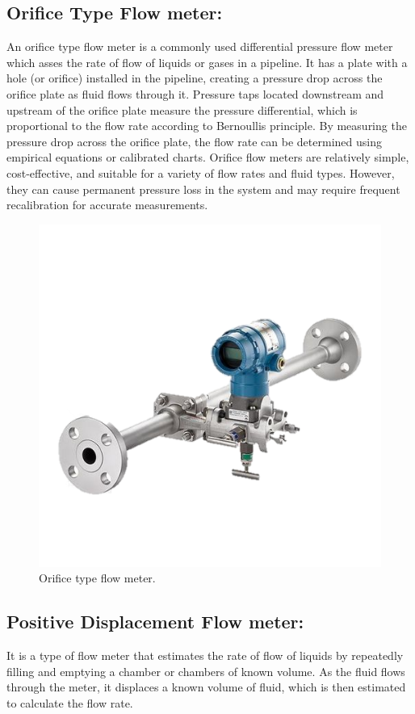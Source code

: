 \subsection{Orifice Type Flow meter:}

An orifice type flow meter is a commonly used differential pressure flow
meter which asses the rate of flow of liquids or gases in a pipeline. It
has a plate with a hole (or orifice) installed in the pipeline, creating
a pressure drop across the orifice plate as fluid flows through it.
Pressure taps located downstream and upstream of the orifice plate
measure the pressure differential, which is proportional to the flow
rate according to Bernoulli\textquotesingle s principle. By measuring
the pressure drop across the orifice plate, the flow rate can be
determined using empirical equations or calibrated charts. Orifice flow
meters are relatively simple, cost-effective, and suitable for a variety
of flow rates and fluid types. However, they can cause permanent
pressure loss in the system and may require frequent recalibration for
accurate measurements.


\begin{figure}[h!]
    \centering
    \includegraphics[width=0.7\linewidth]{figs/flowmeters/image19.png}
    \caption{Orifice type flow meter.}
    \label{fig:orifice_flow_meter}
\end{figure}


\subsection{Positive Displacement Flow meter:}

It is a type of flow meter that estimates the rate of flow of liquids by
repeatedly filling and emptying a chamber or chambers of known volume.
As the fluid flows through the meter, it displaces a known volume of
fluid, which is then estimated to calculate the flow rate.

